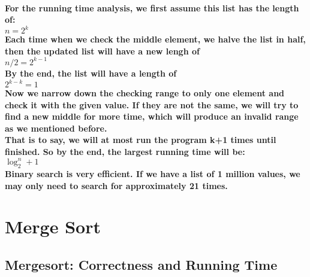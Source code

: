 \documentclass{article}
\begin{document}
\paragraph{For the running time analysis, we first assume this list has the length of:\\
$n = 2^k$\\
Each time when we check the middle element, we halve the list in half, then the updated list will have a new lengh of\\
$n/2 = 2^{k-1}$\\
By the end, the list will have a length of\\
$2^{k-k} = 1$\\
Now we narrow down the checking range to only one element and check it with the given value. If they are not the same, we will try to find a new middle for more time, which will produce an invalid range as we mentioned before.\\
That is to say, we will at most run the program k+1 times until finished. So by the end, the largest running time will be: \\
$\log_2^n + 1$\\
Binary search is very efficient. If we have a list of 1 million values, we may only need to search for approximately 21 times.}


\newpage

\section{Merge Sort}

\subsection{Mergesort: Correctness and Running Time}
\end{document}
